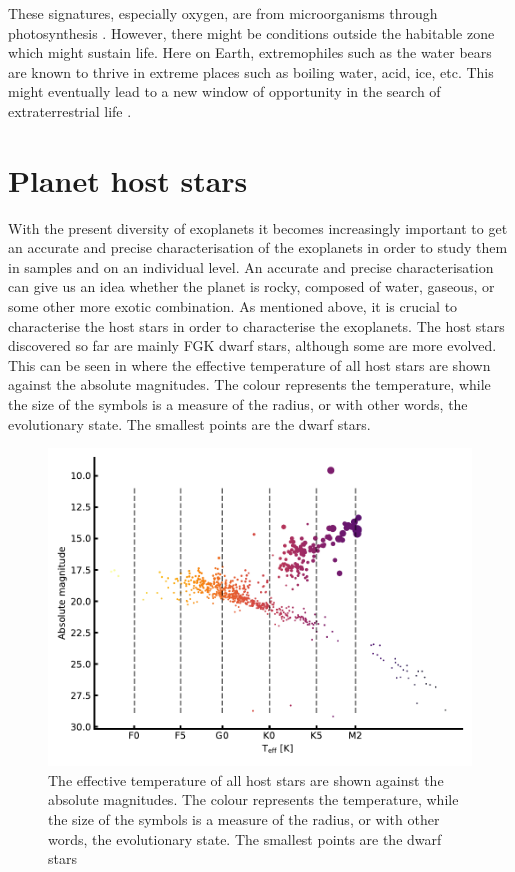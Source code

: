 These signatures, especially oxygen, are from microorganisms through photosynthesis
\citep[see e.g.][]{Kasting2002}. However, there might be conditions outside the habitable zone which
might sustain life. Here on Earth, extremophiles such as the water bears are known to thrive in
extreme places such as boiling water, acid, ice, etc. This might eventually lead to a new window of
opportunity in the search of extraterrestrial life \citep{Cavicchioli2002}.



\section{Planet host stars}
\label{sec:planet_host_stars}

With the present diversity of exoplanets it becomes increasingly important to get an accurate and
precise characterisation of the exoplanets in order to study them in samples and on an individual
level. An accurate and precise characterisation can give us an idea whether the planet is rocky,
composed of water, gaseous, or some other more exotic combination. As mentioned above, it is crucial
to characterise the host stars in order to characterise the exoplanets. The host stars discovered so
far are mainly FGK dwarf stars, although some are more evolved. This can be seen in
 where the effective temperature of all host stars are shown against the
absolute magnitudes. The colour represents the temperature, while the size of the symbols is a
measure of the radius, or with other words, the evolutionary state. The smallest points are the
dwarf stars.

\begin{figure}[htpb!]
    \centering
    \includegraphics[width=1.0\linewidth]{figures/hostDistribution.pdf}
    \caption{The effective temperature of all host stars are shown against the absolute magnitudes.
             The colour represents the temperature, while the size of the symbols is a measure of
             the radius, or with other words, the evolutionary state. The smallest points are the
             dwarf stars}
    \label{fig:hostDistribution}
\end{figure}

